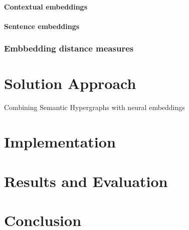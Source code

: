\documentclass[11pt]{scrreprt}
\begin{document}
\subsubsection{Contextual embeddings}

\subsubsection{Sentence embeddings}

\subsection{Embbedding distance measures}




\chapter{Solution Approach}

Combining Semantic Hypergraphs with neural embeddings



\chapter{Implementation}



\chapter{Results and Evaluation}



\chapter{Conclusion}








\printbibliography
\end{document}
